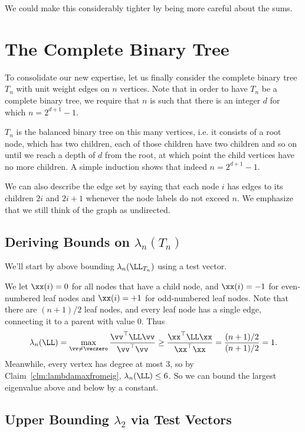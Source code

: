We could make this considerably tighter by being more careful about the sums.

\section{The Complete Binary Tree}

To consolidate our new expertise, let us finally consider the complete binary tree $T_n$ with unit
weight edges on $n$ vertices. Note that in order to have $T_n$ be a complete binary tree, we require that $n$ is such that there is an integer $d$ for which $n = 
2^{d+1}-1$.

$T_n$ is the balanced binary tree on this many vertices, i.e. it
consists of a root node, which has two children, each of those
children have two children and so on until we reach a depth of $d$
from the root, at which point the child vertices have no more
children.
A simple induction shows that indeed $n = 2^{d+1}-1$.

We can also describe the edge set by saying that each node $i$ has
edges to its children $2i$ and $2i+1$ whenever the node labels do not
exceed $n$.
We emphasize that we still think of the graph as undirected.


\subsection{Deriving Bounds on $\lambda_n(T_n)$}

We'll start by above bounding $\lambda_n(\LL_{T_n})$ using a test
vector.

We let $\xx(i) = 0$ for all nodes that have a child node, and $\xx(i)
= -1$ for even-numbered leaf nodes and $\xx(i) = +1$ for odd-numbered
leaf nodes.
Note that there are $(n+1)/2$ leaf nodes, and every leaf node has a
single edge, connecting it to a parent with value $0$.
Thus
\begin{align}
\lambda_n(\LL) = \max_{ \substack{ \vv \neq \veczero} } \frac{
  \vv^\top \LL \vv}{ \vv^\top \vv}
  \geq
  \frac{\xx^\top \LL \xx}
  { \xx^\top \xx}
  =
  \frac{ (n+1)/2 }{ (n+1)/2 }
  = 1
  .
\end{align}
Meanwhile, every vertex has degree at most 3, so by
Claim~\ref{clm:lambdamaxfromeig}, $\lambda_n(\LL) \leq 6$.
So we can bound the largest eigenvalue above and below by a constant.

\subsection{Upper Bounding $\lambda_2$ via Test Vectors}

